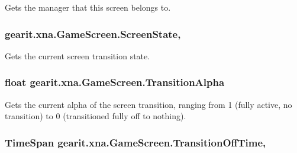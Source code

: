 Gets the manager that this screen belongs to. 

\hypertarget{classgearit_1_1xna_1_1_game_screen_a2bdf13bb100f4e09a7797d85570b80e7}{
\subsubsection[{Screen\+State}]{ gearit.\+xna.\+Game\+Screen.\+Screen\+State\hspace{0.3cm}{\ttfamily [get]}, {}}}\label{classgearit_1_1xna_1_1_game_screen_a2bdf13bb100f4e09a7797d85570b80e7}


Gets the current screen transition state. 

\hypertarget{classgearit_1_1xna_1_1_game_screen_a5fe8bffc9a9e5d36e77e3ebadd9e8685}{
\subsubsection[{Transition\+Alpha}]{\setlength{\rightskip}{0pt plus 5cm}float gearit.\+xna.\+Game\+Screen.\+Transition\+Alpha\hspace{0.3cm}{\ttfamily [get]}}}\label{classgearit_1_1xna_1_1_game_screen_a5fe8bffc9a9e5d36e77e3ebadd9e8685}


Gets the current alpha of the screen transition, ranging from 1 (fully active, no transition) to 0 (transitioned fully off to nothing). 

\hypertarget{classgearit_1_1xna_1_1_game_screen_af44db4f893dc3ddfb5bc1db19cef96d2}{
\subsubsection[{Transition\+Off\+Time}]{\setlength{\rightskip}{0pt plus 5cm}Time\+Span gearit.\+xna.\+Game\+Screen.\+Transition\+Off\+Time\hspace{0.3cm}{\ttfamily [get]}, {}}}\label{classgearit_1_1xna_1_1_game_screen_af44db4f893dc3ddfb5bc1db19cef96d2}


